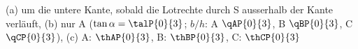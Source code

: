 (a) um die untere Kante, sobald die Lotrechte durch S ausserhalb der Kante verläuft, (b) nur A ($\tan\alpha = \talP{0}{3}$; $b/h$: A $\qAP{0}{3}$, B $\qBP{0}{3}$, C $\qCP{0}{3}$), (c) A: $\thAP{0}{3}$, B: $\thBP{0}{3}$, C: $\thCP{0}{3}$
